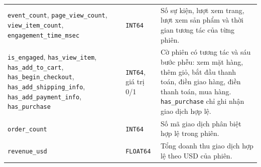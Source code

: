 \begin{xltabular}{\textwidth}{>{\raggedright\arraybackslash}p{4.5cm} >{\raggedright\arraybackslash}p{2.2cm} >{\raggedright\arraybackslash}X}
\texttt{event\_count}, \texttt{page\_view\_count}, \texttt{view\_item\_count}, \texttt{engagement\_time\_msec}
& \texttt{INT64}
& Số sự kiện, lượt xem trang, lượt xem sản phẩm và thời gian tương tác của từng phiên. \\

\texttt{is\_engaged}, \texttt{has\_view\_item}, \texttt{has\_add\_to\_cart}, \texttt{has\_begin\_checkout}, \texttt{has\_add\_shipping\_info}, \texttt{has\_add\_payment\_info}, \texttt{has\_purchase}
& \texttt{INT64}, giá trị 0/1
& Cờ phiên có tương tác và sáu bước phễu: xem mặt hàng, thêm giỏ, bắt đầu thanh toán, điền giao hàng, điền thanh toán, mua hàng. \texttt{has\_purchase} chỉ ghi nhận giao dịch hợp lệ. \\

\texttt{order\_count}
& \texttt{INT64}
& Số mã giao dịch phân biệt hợp lệ trong phiên. \\

\texttt{revenue\_usd}
& \texttt{FLOAT64}
& Tổng doanh thu giao dịch hợp lệ theo USD của phiên. \\
\end{xltabular}

